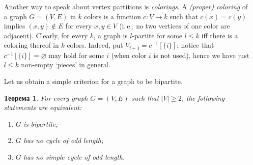 \documentclass[12pt,notitlepage]{article}
\theoremstyle{plain}
\newtheorem{thm}{Теорема}[section]
\theoremstyle{definition}
\theoremstyle{plain}
\newcommand{\void}{\varnothing}
\newcommand{\ul}[1]{\underline{#1}}
\newcommand{\1}{\mathbf{1}}
\newcommand{\0}{\mathbf{0}}
\begin{document}
Another way to speak about vertex partitions is \emph{colorings}. A \emph{(proper) coloring} of a graph $G = (V, E)$ in $k$ colors is a function $c\colon V \to \ul{k}$ such that $c(x) = c(y)$ implies $(x, y) \notin E$ for every $x, y \in V$ (i.\,e., no two vertices of one color are adjacent). Clearly, for every $k$, a graph is $l$-partite for some $l \leq k$ iff there is a coloring thereof in $k$ colors. Indeed, put $V_{i+1} = c^{-1}[\{ i \}]$; notice that $c^{-1}[\{ i \}] = \void$ may hold for some $i$ (when color $i$ is not used), hence we have just $l \leq k$ non-empty `pieces' in general.

\medskip

Let us obtain a simple criterion for a graph to be bipartite.
\begin{thm}\label{L14:bipartite}
	For every graph $G = (V, E)$ such that $|V| \geq 2$, the following statements are equivalent:
	\begin{enumerate}
		\item $G$ is bipartite;
		\item $G$ has no cycle of odd length;
		\item $G$ has no simple cycle of odd length.
	\end{enumerate}
\end{thm}
\end{document}
